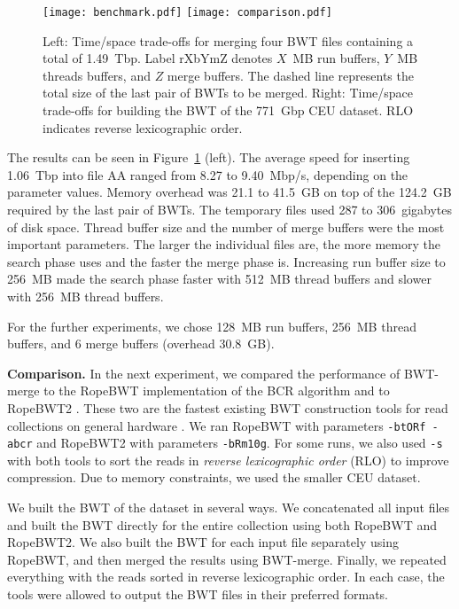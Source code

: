 \documentclass[smallabstract,smallcaptions]{dccpaper}
\newcommand{\BWT}{\textsf{BWT}}
\newcommand{\BWTmerge}{\textsf{BWT\nobreakdash-merge}}
\newcommand{\ropebwt}{\textsf{RopeBWT}}
\newcommand{\ropebwtii}{\textsf{RopeBWT2}}
\newcommand{\CEU}{\textsf{CEU}}
\begin{document}
\begin{figure}[t!]
\begin{center}
\texttt{[image: benchmark.pdf]}%
\hspace{-0.3in}%
\texttt{[image: comparison.pdf]}
\end{center}
\caption{Left: Time/space trade-offs for merging four \BWT{} files containing a total of 1.49~Tbp. Label rXbYmZ denotes $X$~MB run buffers, $Y$~MB threads buffers, and $Z$ merge buffers. The dashed line represents the total size of the last pair of \BWT{}s to be merged. Right: Time/space trade-offs for building the \BWT{} of the 771~Gbp \CEU{} dataset. RLO indicates reverse lexicographic order.}\label{fig:benchmark}
\end{figure}

The results can be seen in Figure~\ref{fig:benchmark} (left). The average speed for inserting 1.06~Tbp into file AA ranged from 8.27 to 9.40~Mbp/s, depending on the parameter values. Memory overhead was 21.1 to 41.5~GB on top of the 124.2~GB required by the last pair of \BWT{}s. The temporary files used 287 to 306~gigabytes of disk space. Thread buffer size and the number of merge buffers were the most important parameters. The larger the individual files are, the more memory the search phase uses and the faster the merge phase is. Increasing run buffer size to 256~MB made the search phase faster with 512~MB thread buffers and slower with 256~MB thread buffers.

For the further experiments, we chose 128~MB run buffers, 256~MB thread buffers, and 6 merge buffers (overhead 30.8~GB).

\smallbreak\noindent\textbf{Comparison.} In the next experiment, we compared the performance of \BWTmerge{} to the \ropebwt{} \cite{Li2011-2013} implementation of the BCR algorithm \cite{Bauer2013} and to \ropebwtii{} \cite{Li2014a}. These two are the fastest existing \BWT{} construction tools for read collections on general hardware \cite{Li2014a}. We ran \ropebwt{} with parameters \texttt{-btORf -abcr} and \ropebwtii{} with parameters \texttt{-bRm10g}. For some runs, we also used \texttt{-s} with both tools to sort the reads in \emph{reverse lexicographic order} (RLO) to improve compression. Due to memory constraints, we used the smaller \CEU{} dataset.

We built the \BWT{} of the dataset in several ways. We concatenated all input files and built the \BWT{} directly for the entire collection using both \ropebwt{} and \ropebwtii{}. We also built the \BWT{} for each input file separately using \ropebwt{}, and then merged the results using \BWTmerge{}. Finally, we repeated everything with the reads sorted in reverse lexicographic order. In each case, the tools were allowed to output the \BWT{} files in their preferred formats.
\end{document}
